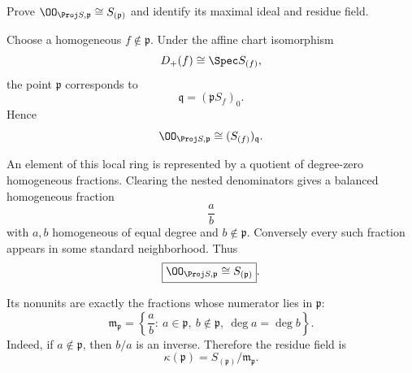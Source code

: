 \begin{problem}\label{prob:vi35-04}
Prove \(\OO_{\Proj S,\mathfrak p}\cong S_{(\mathfrak p)}\) and identify its maximal ideal and residue field.
\end{problem}

\ifdefined\FullProblemDossiers
\begin{solution}
Choose a homogeneous \(f\notin\mathfrak p\). Under the affine chart isomorphism
\[
D_+(f)\cong\Spec S_{(f)},
\]
the point \(\mathfrak p\) corresponds to
\[
\mathfrak q=(\mathfrak pS_f)_0.
\]
Hence
\[
\OO_{\Proj S,\mathfrak p}
\cong
(S_{(f)})_{\mathfrak q}.
\]

An element of this local ring is represented by a quotient of degree-zero homogeneous fractions. Clearing the
nested denominators gives a balanced homogeneous fraction
\[
\frac ab
\]
with \(a,b\) homogeneous of equal degree and \(b\notin\mathfrak p\). Conversely every such fraction appears in
some standard neighborhood. Thus
\[
\boxed{\OO_{\Proj S,\mathfrak p}\cong S_{(\mathfrak p)}}.
\]

Its nonunits are exactly the fractions whose numerator lies in \(\mathfrak p\):
\[
\boxed{
\mathfrak m_{\mathfrak p}
=
\left\{\frac ab:\ a\in\mathfrak p,\ b\notin\mathfrak p,\ \deg a=\deg b\right\}.
}
\]
Indeed, if \(a\notin\mathfrak p\), then \(b/a\) is an inverse. Therefore the residue field is
\[
\boxed{
\kappa(\mathfrak p)
=
S_{(\mathfrak p)}/\mathfrak m_{\mathfrak p}.
}
\]
\end{solution}
\fi
